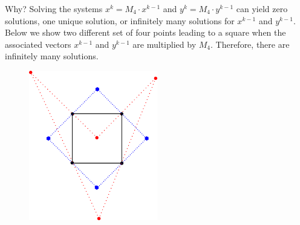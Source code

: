 \documentclass{article}
\begin{document}
\begin{enumerate}[label = (\arabic*)]
	Why? Solving the systems $x^k = M_4\cdot x^{k-1}$ and $y^k = M_4\cdot y^{k-1}$ can yield zero solutions, one unique solution, or infinitely many solutions for $x^{k-1}$ and $y^{k-1}$. Below we show two different set of four points leading to a square when the associated vectors $x^{k-1}$ and $y^{k-1}$ are multiplied by $M_4$. Therefore, there are infinitely many solutions.
	\begin{figure}[H]
		\centering
		\includegraphics[width=0.5\textwidth]{exercise_2_7}
		\label{fig:ex_2_7}
	\end{figure}
	
			
	
\end{enumerate}
\end{document}
